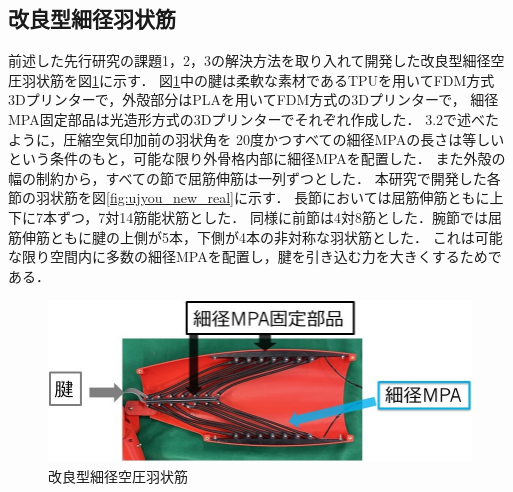 \subsection{改良型細径羽状筋}
前述した先行研究の課題1，2，3の解決方法を取り入れて開発した改良型細径空圧羽状筋を図\ref{fig:ujyoukin_new}に示す．
図\ref{fig:ujyoukin_new}中の腱は柔軟な素材であるTPUを用いてFDM方式3Dプリンターで，外殻部分はPLAを用いてFDM方式の3Dプリンターで，
細径MPA固定部品は光造形方式の3Dプリンターでそれぞれ作成した．
3.2で述べたように，圧縮空気印加前の羽状角を 20度かつすべての細径MPAの長さは等しいという条件のもと，可能な限り外骨格内部に細径MPAを配置した．
また外殻の幅の制約から，すべての節で屈筋伸筋は一列ずつとした．
本研究で開発した各節の羽状筋を図\ref{fig:ujyou_new_real}に示す．
長節においては屈筋伸筋ともに上下に7本ずつ，7対14筋能状筋とした．
同様に前節は4対8筋とした．腕節では屈筋伸筋ともに腱の上側が5本，下側が4本の非対称な羽状筋とした．
これは可能な限り空間内に多数の細径MPAを配置し，腱を引き込む力を大きくするためである．
%
\begin{figure}[htbp]
  \centering
  \includegraphics[scale=0.65]{image/uyjoukin_new.jpg}
  \caption{改良型細径空圧羽状筋}
  \label{fig:ujyoukin_new}
\end{figure}
%
